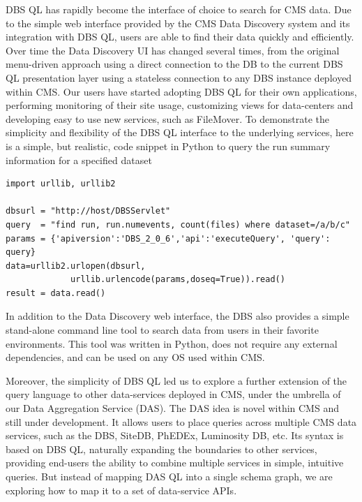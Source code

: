 \documentclass[a4paper]{jpconf}
\begin{document}
DBS QL has rapidly become the interface of choice to search for
CMS data. Due to the simple web interface provided by the CMS
Data Discovery\cite{DD} system and its integration with DBS QL,
users are able to find their data quickly and
efficiently. Over time the Data Discovery UI has
changed several times, from the original menu-driven approach using
a direct connection to the DB to the current DBS QL presentation layer
using a stateless connection to any DBS instance deployed
within CMS. Our users have started adopting DBS QL for their
own applications, performing monitoring of their
site usage, customizing views for data-centers
and developing easy to use new services, such as
FileMover\cite{FileMover}. To demonstrate the simplicity and
flexibility of the DBS QL interface to the underlying services,
here is a simple, but realistic,
code snippet in Python to query the run summary information
for a specified dataset
\begin{verbatim}
import urllib, urllib2

dbsurl = "http://host/DBSServlet"
query  = "find run, run.numevents, count(files) where dataset=/a/b/c"
params = {'apiversion':'DBS_2_0_6','api':'executeQuery', 'query': query} 
data=urllib2.urlopen(dbsurl,
             urllib.urlencode(params,doseq=True)).read()
result = data.read()
\end{verbatim}
In addition to the Data Discovery web interface, the DBS also
provides a simple stand-alone command line tool
to search data from users in their
favorite environments. This tool was written
in Python, does not require any external dependencies, and can
be used on any OS used within CMS.

Moreover, the simplicity of DBS QL led us to explore a further
extension of the query language to other data-services deployed in CMS, under
the umbrella of our Data Aggregation Service (DAS). The DAS idea is
novel within CMS and still under development.
It allows users to place queries across multiple CMS data services,
such as the DBS, SiteDB, PhEDEx, Luminosity DB, etc.  Its syntax
is based on DBS QL, naturally
expanding the boundaries to other services, providing
end-users the ability to combine multiple services in simple, intuitive
queries. But instead of mapping DAS QL into a single
schema graph, we are exploring how to map it to a set of data-service APIs.
\end{document}
